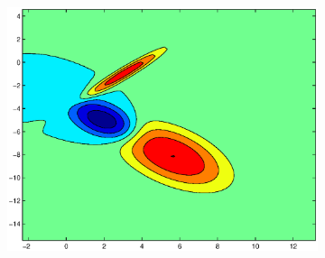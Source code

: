 \documentclass[useAMS,usenatbib,fleqn]{mn2e}
\begin{document}
\begin{figure}
\begin{subfigure}[b]{0.3\columnwidth}
                \includegraphics[width=\textwidth]{figures/VC3.eps}
        \end{subfigure}
       

\end{figure}
\end{document}
